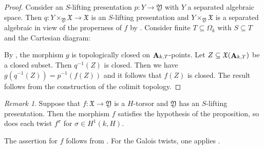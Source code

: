 \documentclass[12pt, final]{amsart}
\theoremstyle{remark}
\newtheorem{remark}[example]{Remark}
\theoremstyle{definition}
\theoremstyle{plain}
\newcommand{\fX}{{\mathfrak X}}
\newcommand{\fY}{{\mathfrak Y}}
\DeclareMathOperator{\bA}{{\bf A}}
\begin{document}
\begin{proof}
        Consider an $S$-lifting presentation $p:Y\to \fY$ with $Y$ a separated algebraic space. Then $q:Y\times_{\fY}\fX\to \fX$ is an $S$-lifting presentation 
        and $Y\times_{\fY}\fX$ is a separated algebraic in view of the properness of $f$ by \cite[Lemma 2.16]{Dhillon:25}. Consider finite $T\subseteq \Omega_{k}$ with $S\subseteq T$ and the 
        Cartesian diagram:
        \begin{center}
        \end{center}
        By \cite[Proposition 5.8]{conrad2020}, the morphism $g$ is topologically closed on $\bA_{k,T}$-points. 
        Let $Z\subseteq \fX(\bA_{k,T})$ be a closed subset. Then $q^{-1}(Z)$ is closed. Then we have 
        $g(q^{-1}(Z)) = p^{-1}(f(Z))$ and it follows that $f(Z)$ is closed. 
        The result follows from the construction of the colimit topology. 
\end{proof}

\begin{remark}\label{r:torsor}
    Suppose that $f:\fX\to\fY$ is a $H$-torsor and $\fY$ has an $S$-lifting 
    presentation. Then the morphism $f$ satisfies the hypothesis of the proposition, so does each twist 
    $f^{\sigma}$ for $\sigma\in H^1(k,H)$. 

    The assertion for $f$ follows from . For the Galois twists, one applies . 
\end{remark}
\end{document}
